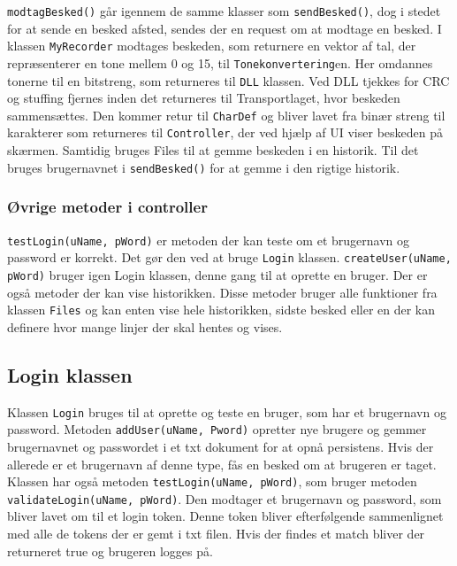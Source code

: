 \newline
\texttt{modtagBesked()} går igennem de samme klasser som \texttt{sendBesked()}, dog i stedet for at sende en besked afsted, sendes der en request om at modtage en besked. I klassen \texttt{MyRecorder} modtages beskeden, som returnere en vektor af tal, der repræsenterer en tone mellem 0 og 15, til \texttt{Tonekonvertering}en. Her omdannes tonerne til en bitstreng, som returneres til \texttt{DLL} klassen. Ved DLL tjekkes for CRC og stuffing fjernes inden det returneres til Transportlaget, hvor beskeden sammensættes. Den kommer retur til \texttt{CharDef} og bliver lavet fra binær streng til karakterer som returneres til \texttt{Controller}, der ved hjælp af UI viser beskeden på skærmen. Samtidig bruges Files til at gemme beskeden i en historik. Til det bruges brugernavnet i \texttt{sendBesked()} for at gemme i den rigtige historik.

\subsubsection{Øvrige metoder i controller}
\texttt{testLogin(uName, pWord)} er metoden der kan teste om et brugernavn og password er korrekt. Det gør den ved at bruge \texttt{Login} klassen.
\newline
\texttt{createUser(uName, pWord)} bruger igen Login klassen, denne gang til at oprette en bruger.
Der er også metoder der kan vise historikken. Disse metoder bruger alle funktioner fra klassen \texttt{Files} og kan enten vise hele historikken, sidste besked eller en der kan definere hvor mange linjer der skal hentes og vises.

\subsection{Login klassen}
Klassen \texttt{Login} bruges til at oprette og teste en bruger, som har et brugernavn og password.
\newline
Metoden \texttt{addUser(uName, Pword)} opretter nye brugere og gemmer brugernavnet og passwordet i et txt dokument for at opnå persistens. Hvis der allerede er et brugernavn af denne type, fås en besked om at brugeren er taget.
\newline
Klassen har også metoden \texttt{testLogin(uName, pWord)}, som bruger metoden \texttt{validateLogin(uName, pWord)}. Den modtager et brugernavn og password, som bliver lavet om til et login token. Denne token bliver efterfølgende sammenlignet med alle de tokens der er gemt i txt filen. Hvis der findes et match bliver der returneret true og brugeren logges på.


